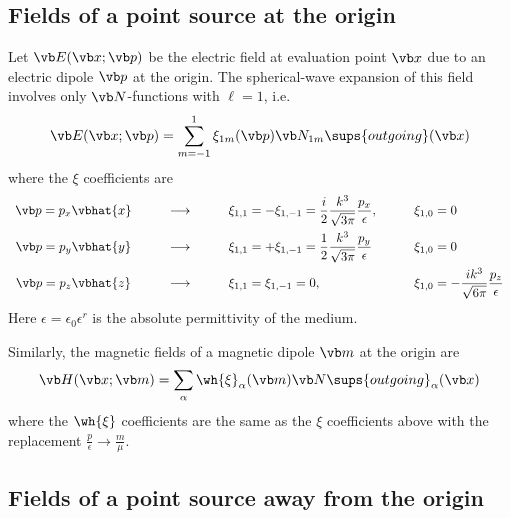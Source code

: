 \documentclass[letterpaper]{article}
\begin{document}
\subsection{Fields of a point source at the origin}

Let $\vb E(\vb x; \vb p)$ be the electric field
at evaluation point $\vb x$ due to an electric dipole
$\vb p$ at the origin. The spherical-wave expansion
of this field involves only $\vb N$-functions
with $\ell=1$, i.e.
$$ \vb E(\vb x; \vb p) = 
   \sum_{m=-1}^1 \xi_{1m}(\vb p) \vb N_{1m}\sups{outgoing}(\vb x)
$$
where the $\xi$ coefficients are
$$\begin{array}{clll}
\vb p=p_x \vbhat{x}
&\qquad\longrightarrow\qquad
&\displaystyle{
  \xi_{1,1}=-\xi_{1,-1}=\frac{i}{2}\frac{k^3}{\sqrt{3\pi}}\frac{p_x}{\epsilon},
              }
&\qquad\xi_{1,0}=0
\\[10pt]
\vb p=p_y \vbhat{y}
&\qquad\longrightarrow\qquad
&\displaystyle{
 \xi_{1,1}=+\xi_{1,-1}=\frac{1}{2}\frac{k^3}{\sqrt{3\pi}}\frac{p_y}{\epsilon}
              }
&\qquad\xi_{1,0}=0
\\[10pt]
\vb p=p_z \vbhat{z}
&\qquad\longrightarrow\qquad
&\displaystyle{
 \xi_{1,1}=\xi_{1,-1}=0, 
              } 
&\qquad \xi_{1,0} = 
  \displaystyle{ -\frac{ik^3}{\sqrt{6\pi}} \frac{p_z}{\epsilon} }
\end{array}$$
Here $\epsilon=\epsilon_0\epsilon^r$ is the absolute permittivity
of the medium.

Similarly, the magnetic fields of a magnetic dipole $\vb m$ at the
origin are
$$ \vb H(\vb x; \vb m)=\sum_\alpha \wh{\xi}_\alpha(\vb m) \vb N\sups{outgoing}_\alpha(\vb x)
$$
where the $\wh{\xi}$ coefficients are the same as the
$\xi$ coefficients above with the replacement
$\frac{p}{\epsilon} \to \frac{m}{\mu}.$

\subsection{Fields of a point source away from the origin}
\end{document}
